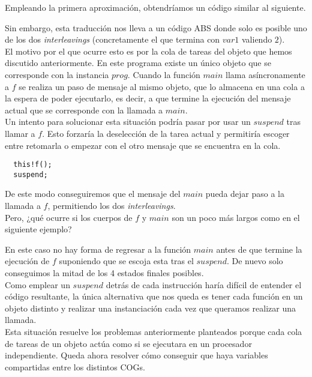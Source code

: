 Empleando la primera aproximación, obtendríamos un código similar al siguiente.



Sin embargo, esta traducción nos lleva a un código ABS donde solo es posible uno de los dos \emph{interleavings} (concretamente el que termina con $var1$ valiendo $2$).\\

El motivo por el que ocurre esto es por la cola de tareas del objeto que hemos discutido anteriormente. En este programa existe un único objeto que se corresponde con la instancia $prog$. Cuando la función $main$ llama asíncronamente a $f$ se realiza un paso de mensaje al mismo objeto, que lo almacena en una cola a la espera de poder ejecutarlo, es decir, a que termine la ejecución del mensaje actual que se corresponde con la llamada a $main$.\\

Un intento para solucionar esta situación podría pasar por usar un $suspend$ tras llamar a $f$. Esto forzaría la deselección de la tarea actual y permitiría escoger entre retomarla o empezar con el otro mensaje que se encuentra en la cola.

\begin{lstlisting}
  this!f();
  suspend;
\end{lstlisting}

De este modo conseguiremos que el mensaje del $main$ pueda dejar paso a la llamada a $f$, permitiendo los dos \emph{interleavings}.\\

Pero, ¿qué ocurre si los cuerpos de $f$ y $main$ son un poco más largos como en el siguiente ejemplo?



En este caso no hay forma de regresar a la función $main$ antes de que termine la ejecución de $f$ suponiendo que se escoja esta tras el $suspend$. De nuevo solo conseguimos la mitad de los 4 estados finales posibles.\\

Como emplear un $suspend$ detrás de cada instrucción haría difícil de entender el código resultante, la única alternativa que nos queda es tener cada función en un objeto distinto y realizar una instanciación cada vez que queramos realizar una llamada.\\

Esta situación resuelve los problemas anteriormente planteados porque cada cola de tareas de un objeto actúa como si se ejecutara en un procesador independiente. Queda ahora resolver cómo conseguir que haya variables compartidas entre los distintos COGs.\\

